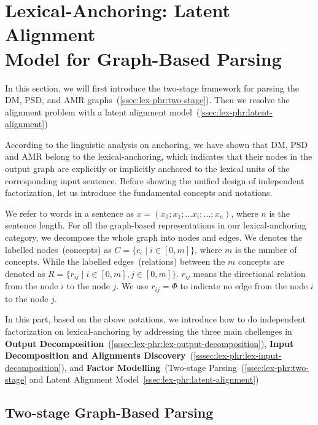 \section[Lexical-Anchoring: Latent Alignment Model for Graph-Based
Parsing]{Lexical-Anchoring: Latent Alignment \\Model for Graph-Based Parsing}
\label{sec:lex-phr:graph-based}

In this section, we will first introduce the two-stage framework for parsing
the DM, PSD, and AMR graphs~(\autoref{ssec:lex-phr:two-stage}). Then we
resolve the alignment problem with a latent alignment model~(\autoref{ssec:lex-phr:latent-alignment})


According to the linguistic analysis on anchoring, we have shown that
DM, PSD and AMR belong to the lexical-anchoring, which indicates that
their nodes in the output graph are explicitly or implicitly anchored
to the lexical units of the corresponding input sentence.  Before
showing the unified design of independent factorization, let us
introduce the fundamental concepts and notations.

We refer to words in a sentence as
$x=(x_{0};x_{1};...x_{i};...;x_{n})$, where $n$ is the sentence
length.  For all the graph-based representations in our
lexical-anchoring category, we decompose the whole graph into nodes
and edges. We denotes the labelled nodes~(concepts) as
$C = \{c_{i}\mid i \in [0,m]\}$, where $m$ is the number of concepts.
While the labelled edges~(relations) between the $m$ concepts are
denoted as $R = \{r_{ij}\mid i \in [0, m], j \in [0, m]\}$.  $r_{ij}$ means
the directional relation from the node $i$ to the node $j$.  We use
$r_{ij}=\Phi$ to indicate no edge from the node $i$ to the node $j$.

In this part, based on the above notations, we introduce how to do
independent factorization on lexical-anchoring by addressing the three
main chellenges in \textbf{Output
  Decomposition}~(\autoref{sssec:lex-phr:lex-output-decomposition}),
\textbf{Input Decomposition and Alignments
  Discovery}~(\autoref{sssec:lex-phr:lex-input-decomposition}), and
\textbf{Factor Modelling}~(Two-stage
Parsing~(\autoref{ssec:lex-phr:two-stage} and Latent Alignment
Model~\autoref{ssec:lex-phr:latent-alignment})



\subsection{Two-stage Graph-Based Parsing}
\label{ssec:lex-phr:two-stage}

